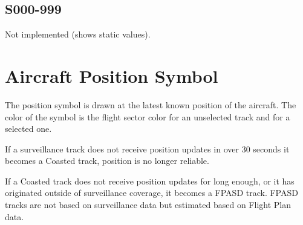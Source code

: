 \documentclass[a4paper,oneside,11pt]{memoir}
\begin{document}
\subsection{S000-999}
Not implemented (shows static values).

\section{Aircraft Position Symbol}

The position symbol is drawn at the latest known position of the aircraft. The color of the symbol is the flight sector color for an unselected track and  for a selected one.

\bigskip

\begin{center}
  \begin{minipage}[b]{0.14\textwidth}\end{minipage}\hfill 
  \begin{minipage}[b]{0.14\textwidth}\end{minipage}\hfill 
  \begin{minipage}[b]{0.14\textwidth}\end{minipage}\hfill  
  \begin{minipage}[b]{0.14\textwidth}\end{minipage}\hfill 
  \begin{minipage}[b]{0.14\textwidth}\end{minipage}\hfill
  \begin{minipage}[b]{0.14\textwidth}\end{minipage}\hfill 
\end{center}  

\bigskip

If a surveillance track does not receive position updates in over 30 seconds it becomes a Coasted track, position is no longer reliable.


If a Coasted track does not receive position updates for long enough, or it has originated outside of surveillance coverage, it becomes a FPASD track. FPASD tracks are not based on surveillance data but estimated based on Flight Plan data.
\end{document}
